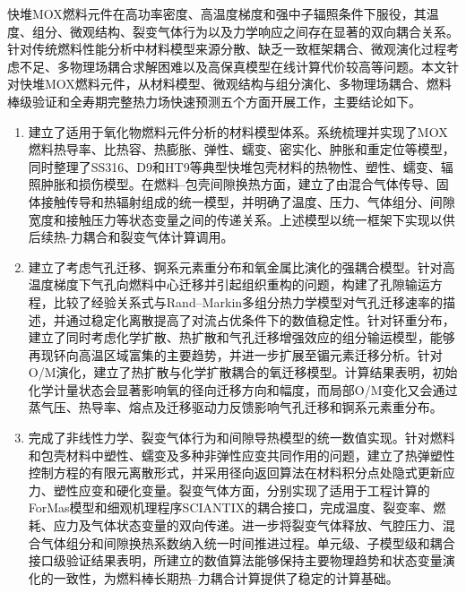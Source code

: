 
\label{chap:conclusions_outlook}


快堆MOX燃料元件在高功率密度、高温度梯度和强中子辐照条件下服役，其温度、组分、微观结构、裂变气体行为以及力学响应之间存在显著的双向耦合关系。针对传统燃料性能分析中材料模型来源分散、缺乏一致框架耦合、微观演化过程考虑不足、多物理场耦合求解困难以及高保真模型在线计算代价较高等问题。本文针对快堆MOX燃料元件，从材料模型、微观结构与组分演化、多物理场耦合、燃料棒级验证和全寿期完整热力场快速预测五个方面开展工作，主要结论如下。

\begin{enumerate}[label={（\arabic*）},leftmargin=2.8em]
	\item 建立了适用于氧化物燃料元件分析的材料模型体系。系统梳理并实现了MOX燃料热导率、比热容、热膨胀、弹性、蠕变、密实化、肿胀和重定位等模型，同时整理了SS316、D9和HT9等典型快堆包壳材料的热物性、塑性、蠕变、辐照肿胀和损伤模型。在燃料--包壳间隙换热方面，建立了由混合气体传导、固体接触传导和热辐射组成的统一模型，并明确了温度、压力、气体组分、间隙宽度和接触压力等状态变量之间的传递关系。上述模型以统一框架下实现以供后续热-力耦合和裂变气体计算调用。

	\item 建立了考虑气孔迁移、锕系元素重分布和氧金属比演化的强耦合模型。针对高温度梯度下气孔向燃料中心迁移并引起组织重构的问题，构建了孔隙输运方程，比较了经验关系式与Rand--Markin多组分热力学模型对气孔迁移速率的描述，并通过稳定化离散提高了对流占优条件下的数值稳定性。针对钚重分布，建立了同时考虑化学扩散、热扩散和气孔迁移增强效应的组分输运模型，能够再现钚向高温区域富集的主要趋势，并进一步扩展至镅元素迁移分析。针对O/M演化，建立了热扩散与化学扩散耦合的氧迁移模型。计算结果表明，初始化学计量状态会显著影响氧的径向迁移方向和幅度，而局部O/M变化又会通过蒸气压、热导率、熔点及迁移驱动力反馈影响气孔迁移和锕系元素重分布。

	\item 完成了非线性力学、裂变气体行为和间隙导热模型的统一数值实现。针对燃料和包壳材料中塑性、蠕变及多种非弹性应变共同作用的问题，建立了热弹塑性控制方程的有限元离散形式，并采用径向返回算法在材料积分点处隐式更新应力、塑性应变和硬化变量。裂变气体方面，分别实现了适用于工程计算的ForMas模型和细观机理程序SCIANTIX的耦合接口，完成温度、裂变率、燃耗、应力及气体状态变量的双向传递。进一步将裂变气体释放、气腔压力、混合气体组分和间隙换热系数纳入统一时间推进过程。单元级、子模型级和耦合接口级验证结果表明，所建立的数值算法能够保持主要物理趋势和状态变量演化的一致性，为燃料棒长期热--力耦合计算提供了稳定的计算基础。


\end{enumerate}
